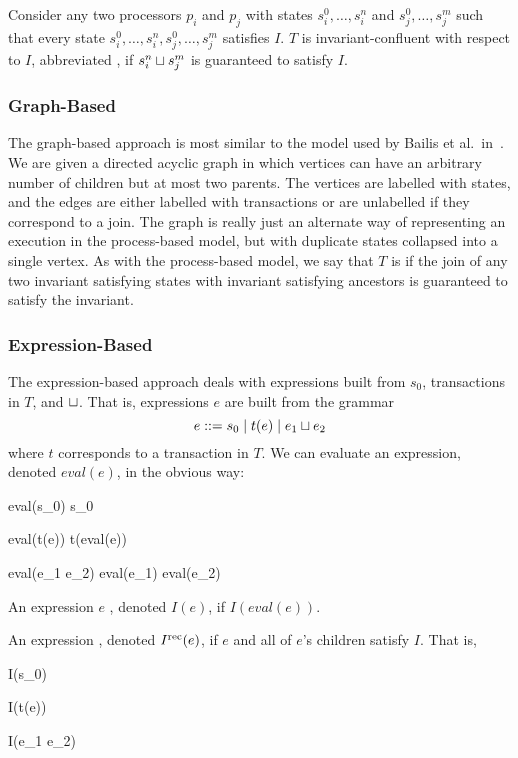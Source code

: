 Consider any two processors $p_i$ and $p_j$ with states $s_i^0, \ldots, s_i^n$
and $s_j^0, \ldots, s_j^m$ such that every state $s_i^0, \ldots, s_i^n, s_j^0,
\ldots, s_j^m$ satisfies $I$. $T$ is invariant-confluent with respect to $I$,
abbreviated , if $s_i^n \sqcup s_j^m$ is guaranteed to
satisfy $I$.

\subsubsection{Graph-Based}
The graph-based approach is most similar to the model used by Bailis et al.\
in~\cite{bailis2014coordination}. We are given a directed acyclic graph in
which vertices can have an arbitrary number of children but at most two
parents. The vertices are labelled with states, and the edges are either
labelled with transactions or are unlabelled if they correspond to a join. The
graph is really just an alternate way of representing an execution in the
process-based model, but with duplicate states collapsed into a single vertex.
As with the process-based model, we say that $T$ is \defword{\Iconfluent{}} if
the join of any two invariant satisfying states with invariant satisfying
ancestors is guaranteed to satisfy the invariant.

\subsubsection{Expression-Based}
The expression-based approach deals with expressions built from $s_0$,
transactions in $T$, and $\sqcup$. That is, expressions $e$ are built from the
grammar
\[
  e ::= s_0 \mid t(e) \mid e_1 \sqcup e_2
\]
where $t$ corresponds to a transaction in $T$. We can evaluate an expression,
denoted $eval(e)$, in the obvious way:
\begin{mathpar}
  eval(s_0)  s_0

  eval(t(e))  t(eval(e))

  eval(e_1 \join e_2)  eval(e_1) \join eval(e_2)
\end{mathpar}

\begin{definition}
  An expression $e$ , denoted $I(e)$, if $I(eval(e))$.
\end{definition}

\begin{definition}
  An expression , denoted $I^{\text{rec}}(e)$, if $e$
  and all of $e$'s children satisfy $I$. That is,
  \begin{mathpar}
      I(s_0)

      I(t(e)) \land {}

     I(e_1 \join e_2) \land {} \land {}
  \end{mathpar}
\end{definition}

